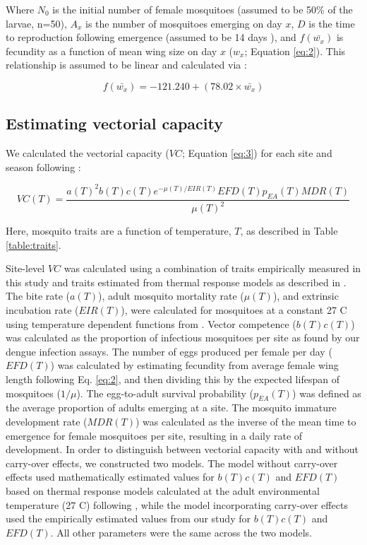\documentclass[12pt]{article}
\begin{document}
Where $N_0$ is the initial number of female mosquitoes (assumed to be 50\% of the larvae, n=50), $A_x$ is the number of mosquitoes emerging on day $x$, $D$ is the time to reproduction following emergence (assumed to be 14 days \citep{livdahl1991}), and $f(\bar{w_x})$ is fecundity as a function of mean wing size on day $x$ ($w_x$; Equation \ref{eq:2}). This relationship is assumed to be linear and calculated via \citep{lounibos2002}:

\begin{equation} \label{eq:2}
f(\bar{w_x}) = -121.240 + (78.02 \times \bar{w_x})
\end{equation}

\subsection{Estimating vectorial capacity}
We calculated the vectorial capacity ($VC$; Equation \ref{eq:3}) for each site and season following \citet{mordecai2017}:

\begin{equation} \label{eq:3}
VC(T) =\frac{a(T)^2b(T)c(T)e^{-\mu (T)/EIR(T)} EFD(T) p_{EA}(T) MDR(T)} {\mu(T)^2}
\end{equation}

Here, mosquito traits are a function of temperature, $T$, as described in Table \ref{table:traits}.

Site-level $VC$ was calculated using a combination of traits empirically measured in this study and traits estimated from thermal response models as described in \citep{mordecai2017}. The bite rate ($a(T)$), adult mosquito mortality rate ($\mu(T)$), and extrinsic incubation rate ($EIR(T)$), were calculated for mosquitoes at a constant 27 \degree C using temperature dependent functions from \citep{mordecai2017}. Vector competence ($b(T)c(T)$) was calculated as the proportion of infectious mosquitoes per site as found by our dengue infection assays. The number of eggs produced per female per day ($EFD(T)$) was calculated by estimating fecundity from average female wing length following Eq. \ref{eq:2}, and then dividing this by the expected lifespan of mosquitoes ($1/\mu$). The egg-to-adult survival probability ($p_{EA}(T)$) was defined as the average proportion of adults emerging at a site. The mosquito immature development rate ($MDR(T)$) was calculated as the inverse of the mean time to emergence for female mosquitoes per site, resulting in a daily rate of development. In order to distinguish between vectorial capacity with and without carry-over effects, we constructed two models. The model without carry-over effects used mathematically estimated values for $b(T)c(T)$ and $EFD(T)$ based on thermal response models calculated at the adult environmental temperature (27 \degree C) following \citep{mordecai2017}, while the model incorporating carry-over effects used the empirically estimated values from our study for $b(T)c(T)$ and $EFD(T)$. All other parameters were the same across the two models.
\end{document}
